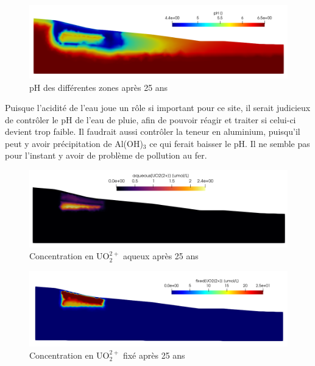 \documentclass{article}
\begin{document}
\begin{figure}[H]
    \centering
    \includegraphics[width=\linewidth]{III_B_4_1.png}
    \caption{pH des différentes zones après 25 ans}
    \label{fig:pH-final}
\end{figure}

Puisque l’acidité de l’eau joue un rôle si important pour ce site, il serait judicieux de contrôler le pH de l’eau de pluie, afin de pouvoir réagir et traiter si celui-ci devient trop faible. Il faudrait aussi contrôler la teneur en aluminium, puisqu’il peut y avoir précipitation de Al(OH)$_3$ ce qui ferait baisser le pH. Il ne semble pas pour l’instant y avoir de problème de pollution au fer.

\begin{figure}[H]
    \centering
    \includegraphics[width=\linewidth]{LJ-UO22P-final.PNG}
    \caption{Concentration en UO$_2^{2+}$ aqueux après 25 ans}
    \label{fig:uo2P-aqueux-final}
\end{figure}

\begin{figure}[H]
    \centering
    \includegraphics[width=\linewidth]{III_B_4_2.png}
    \caption{Concentration en UO$_2^{2+}$ fixé après 25 ans}
    \label{fig:uo2P-fixe-final}
\end{figure}
\end{document}
